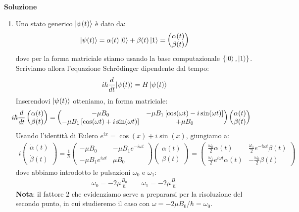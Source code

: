\documentclass[../../InformazioneQuantistica.tex]{subfiles}
\begin{document}
\textbf{Soluzione}
\begin{enumerate}
\item Uno stato generico $\Ket{\psi(t)}$ è dato da:
\begin{align}
\Ket{\psi(t)} = \alpha(t) \Ket{0} + \beta(t) \Ket{1} = \begin{pmatrix}
\alpha(t)\\
\beta(t)
\end{pmatrix}
\label{eqn:generic-psi}
\end{align}
dove per la forma matriciale stiamo usando la base computazionale $\{\Ket{0},\Ket{1}\}$.\\
Scriviamo allora l'equazione Schr\"odinger dipendente dal tempo:
\begin{align*}
i\hbar \frac{d}{dt}{\Ket{\psi(t)}} = H\Ket{\psi(t)}
\end{align*}
Inserendovi $\Ket{\psi(t)}$
otteniamo, in forma matriciale:
\begin{align*}\hspace{-1em}
i\hbar \frac{d}{dt}\begin{pmatrix}\alpha(t)\\ \beta(t) \end{pmatrix} = \begin{pmatrix} -\mu B_0 & -\mu B_1 \left[\cos(\omega t)-i\sin(\omega t)\right]\\
-\mu B_1\left[ \cos(\omega t) + i\sin(\omega t)\right] & +\mu B_0\end{pmatrix} \begin{pmatrix}
\alpha(t)\\
\beta(t) \end{pmatrix}
\end{align*}
Usando l'identità di Eulero $e^{ix}=\cos(x)+i\sin(x)$, giungiamo a:
\begin{align*}
i\begin{pmatrix}
\dot{\alpha}(t)\\
\dot{\beta}(t)
\end{pmatrix}
=\frac{1}{\hbar}\begin{pmatrix}
-\mu B_0 & -\mu B_1 e^{-i\omega t}\\
-\mu B_1 e^{i\omega t} & \mu B_0
\end{pmatrix}\begin{pmatrix}\alpha(t)\\\beta(t)\end{pmatrix} =\begin{pmatrix}
\frac{\omega_0}{2} \alpha(t) & \frac{\omega_1}{2}e^{-i\omega t}\beta(t)\\
\frac{\omega_1}{2}e^{i\omega t} \alpha(t) & -\frac{\omega_0}{2}\beta(t)
\end{pmatrix}
\end{align*}
dove abbiamo introdotto le pulsazioni $\omega_0$ e $\omega_1$:
\begin{align*}
\omega_0 = -2\mu\frac{B_0}{\hbar} \qquad \omega_1 = -2\mu \frac{B_1}{\hbar}
\end{align*}
\textbf{Nota}: il fattore $2$ che evidenziamo serve a prepararsi per la risoluzione del secondo punto, in cui studieremo il caso con $\omega = -2\mu B_0/\hbar = \omega_0$.\\


\end{enumerate}
\end{document}
